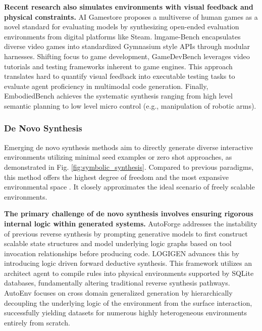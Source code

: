 \documentclass{llmxive}
\begin{document}
\textbf{Recent research also simulates environments with visual feedback and physical constraints.} AI Gamestore \cite{AI_GAMESTORE} proposes a multiverse of human games as a novel standard for evaluating models by synthesizing open-ended evaluation environments from digital platforms like Steam. lmgame-Bench \cite{LMGAME-BENCH} encapsulates diverse video games into standardized Gymnasium style APIs through modular harnesses. Shifting focus to game development, GameDevBench \cite{GameDevBench} leverages video tutorials and testing frameworks inherent to game engines. This approach translates hard to quantify visual feedback into executable testing tasks to evaluate agent proficiency in multimodal code generation. Finally, EmbodiedBench \cite{EmbodiedBench} achieves the systematic synthesis ranging from high level semantic planning to low level micro control (e.g., manipulation of robotic arms). 

\subsubsection{De Novo Synthesis}
\label{sec:synthesis from scratch}

Emerging de novo synthesis methods aim to directly generate diverse interactive environments utilizing minimal seed examples or zero shot approaches, as demonstrated in Fig. \ref{fig:symbolic_synthesis}. Compared to previous paradigms, this method offers the highest degree of freedom and the most expansive environmental space \cite{DeepSeek-V3.2, LongCat-Flash-Thinking-2601, AutoEnv, LOGIGEN, InfiniteWeb, NL2Plan, RandomWorld, MiMo-V2-Flash}. It closely approximates the ideal scenario of freely scalable environments.

\textbf{The primary challenge of de novo synthesis involves ensuring rigorous internal logic within generated systems.} AutoForge \cite{AutoForge} addresses the instability of previous reverse synthesis by prompting generative models to first construct scalable state structures and model underlying logic graphs based on tool invocation relationships before producing code. LOGIGEN \cite{LOGIGEN} advances this by introducing logic driven forward deductive synthesis. This framework utilizes an architect agent to compile rules into physical environments supported by SQLite databases, fundamentally altering traditional reverse synthesis pathways. AutoEnv \cite{AutoEnv} focuses on cross domain generalized generation by hierarchically decoupling the underlying logic of the environment from the surface interaction, successfully yielding datasets for numerous highly heterogeneous environments entirely from scratch.
\end{document}
